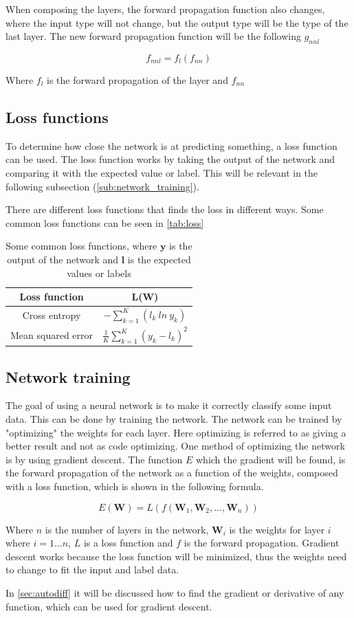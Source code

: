When composing the layers, the forward propagation function also changes, where the input type will not change, but the output type will be the type of the last layer.
The new forward propagation function will be the following $g_{nnl}$

$$f_{nnl} = f_l(f_{nn})$$

Where $f_l$ is the forward propagation of the layer and $f_{nn}$

\subsection{Loss functions}%
\label{sub:Loss functions}

To determine how close the network is at predicting something, a loss function can be used.
The loss function works by taking the output of the network and comparing it with the expected value or label.
This will be relevant in the following subsection (\autoref{sub:network_training}).

There are different loss functions that finds the loss in different ways. Some common loss functions can be seen in \autoref{tab:loss}

\begin{table}[ht]
\centering
\begin{tabular}{|c|c|}
\hline
\textbf{Loss function}  & \textbf{L(W)} \\ \hline
Cross entropy  & $-\sum^K_{k=1}(l_k\ ln\ y_k)$ \\ \hline
Mean squared error & $\frac{1}{K}\sum^K_{k=1}(y_k-l_k)^2$ \\ \hline
\end{tabular}
\caption{Some common loss functions, where $\bm{y}$ is the output of the network and $\bm{l}$ is the expected values or labels}
\label{tab:loss}
\end{table}

\subsection{Network training}%
\label{sub:network_training}

The goal of using a neural network is to make it correctly classify some input data. This can be done by training the network.
The network can be trained by "optimizing" the weights for each layer. Here optimizing is referred to as giving a better result and not as code optimizing.
One method of optimizing the network is by using gradient descent.
The function $E$ which the gradient will be found, is the forward propagation of the network as a function of the weights, composed with a loss function, which is shown in the following formula.

$$E(\bm{W}) = L(f(\bm{W}_1, \bm{W}_2, ..., \bm{W}_n))$$

Where $n$ is the number of layers in the network, $\bm{W}_i$ is the weights for layer $i$ where $i = 1...n$, $L$ is a loss function and $f$ is the forward propagation.
Gradient descent works because the loss function will be minimized, thus the weights need to change to fit the input and label data.

In \autoref{sec:autodiff} it will be discussed how to find the gradient or derivative of any function, which can be used for gradient descent.
